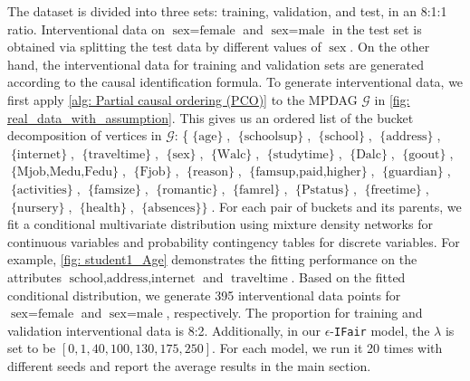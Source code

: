 \documentclass{article} %
\begin{document}
The dataset is divided into three sets: training, validation, and test, in an 8:1:1 ratio. Interventional data on $\operatorname{sex=female}$ and $\operatorname{sex=male}$ in the test set is obtained via splitting the test data by different values of $\operatorname{sex}$. On the other hand, the interventional data for training and validation sets are generated according to the causal identification formula. To generate interventional data, we first apply \cref{alg: Partial causal ordering (PCO)} to the MPDAG $\mathcal{G}$ in \cref{fig: real_data_with_assumption}. This gives us an ordered list of the bucket decomposition of vertices in $\mathcal{G}$: \{$\operatorname{\{age\}}$, $\operatorname{\{schoolsup\}}$, $\operatorname{\{school\}}$, $\operatorname{\{address\}}$, $\operatorname{\{internet\}}$, $\operatorname{\{traveltime\}}$, $\operatorname{\{sex\}}$, $\operatorname{\{Walc\}}$, $\operatorname{\{studytime\}}$, $\operatorname{\{Dalc\}}$, $\operatorname{\{goout\}}$, $\operatorname{\{Mjob, Medu, Fedu\}}$, $\operatorname{\{Fjob\}}$, $\operatorname{\{reason\}}$, $\operatorname{\{famsup, paid, higher\}}$, $\operatorname{\{guardian\}}$, $\operatorname{\{activities\}}$, $\operatorname{\{famsize\}}$, $\operatorname{\{romantic\}}$, $\operatorname{\{famrel\}}$, $\operatorname{\{Pstatus\}}$, $\operatorname{\{freetime\}}$, $\operatorname{\{nursery\}}$, $\operatorname{\{health\}}$, $\operatorname{\{absences\}\}}$. For each pair of buckets and its parents, we fit a conditional multivariate distribution using mixture density networks \cite{bishop1994mixture} for continuous variables and probability contingency tables for discrete variables. For example, \cref{fig: student1_Age} demonstrates the fitting performance on the attributes $\operatorname{school, address, internet}$ and $\operatorname{traveltime}$. Based on the fitted conditional distribution, we generate 395 interventional data points for $\operatorname{sex=female}$ and $\operatorname{sex=male}$, respectively. The proportion for training and validation interventional data is 8:2. Additionally, in our $\epsilon$-\texttt{IFair} model, the $\lambda$ is set to be $[0,1,40,100,130,175,250]$. For each model, we run it 20 times with different seeds and report the average results in the main section.

\end{document}
